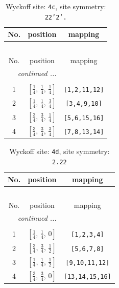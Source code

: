 \documentclass[fleqn,8pt]{jsarticle}
\begin{document}
\renewcommand{\arraystretch}{1.2}
\begin{longtable}{ccc}
\caption{Wyckoff site: {\tt 4c}, site symmetry: {\tt 22'2'.}}
 \\
 \hline \hline
No. & position & mapping \\ \hline \endfirsthead

\multicolumn{2}{l}{\tablename\ \thetable{}} \\
 \hline \hline
No. & position & mapping \\ \hline \endhead

 \hline \hline
\multicolumn{2}{r}{\footnotesize\it continued ...} \\ \endfoot

 \hline \hline
\multicolumn{2}{r}{} \\ \endlastfoot

1 & $\left[ \frac{1}{4},\, \frac{1}{4},\, \frac{1}{4} \right]$ & {\tt [1,2,11,12]} \\ \hline
2 & $\left[ \frac{1}{4},\, \frac{1}{4},\, \frac{3}{4} \right]$ & {\tt [3,4,9,10]} \\ \hline
3 & $\left[ \frac{3}{4},\, \frac{3}{4},\, \frac{1}{4} \right]$ & {\tt [5,6,15,16]} \\ \hline
4 & $\left[ \frac{3}{4},\, \frac{3}{4},\, \frac{3}{4} \right]$ & {\tt [7,8,13,14]} \\
\end{longtable}
\renewcommand{\arraystretch}{1.2}
\begin{longtable}{ccc}
\caption{Wyckoff site: {\tt 4d}, site symmetry: {\tt 2.22}}
 \\
 \hline \hline
No. & position & mapping \\ \hline \endfirsthead

\multicolumn{2}{l}{\tablename\ \thetable{}} \\
 \hline \hline
No. & position & mapping \\ \hline \endhead

 \hline \hline
\multicolumn{2}{r}{\footnotesize\it continued ...} \\ \endfoot

 \hline \hline
\multicolumn{2}{r}{} \\ \endlastfoot

1 & $\left[ \frac{1}{4},\, \frac{1}{4},\, 0 \right]$ & {\tt [1,2,3,4]} \\ \hline
2 & $\left[ \frac{3}{4},\, \frac{3}{4},\, \frac{1}{2} \right]$ & {\tt [5,6,7,8]} \\ \hline
3 & $\left[ \frac{1}{4},\, \frac{1}{4},\, \frac{1}{2} \right]$ & {\tt [9,10,11,12]} \\ \hline
4 & $\left[ \frac{3}{4},\, \frac{3}{4},\, 0 \right]$ & {\tt [13,14,15,16]} \\
\end{longtable}
\end{document}
